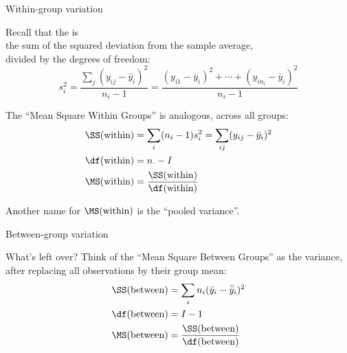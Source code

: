 \begin{frame}{Within-group variation}

  Recall that the  is \\
  the sum of the squared deviation from the sample average,\\
  divided by the degrees of freedom:
  \[
  s_i^2 = \frac{ \sum_j (y_{ij}-\bar y_i)^2 }{ n_i-1 } = \frac{ (y_{i1} - \bar y_i)^2 + \cdots + (y_{in_i} - \bar y_i)^2 }{n_i-1}
  \]

    \vspace{2em}

    The ``\alert{Mean Square Within Groups}'' is analogous, across all groups:
    \begin{align*}
      \SS(\text{within}) &= \sum_{i} (n_i-1) s_i^2 = \sum_{ij} (y_{ij}-\bar y_i)^2 \\
      \df(\text{within}) &= n_\cdot - I \\
      \MS(\text{within}) &= \frac{\SS(\text{within})}{\df(\text{within})}
    \end{align*}

    Another name for $\MS(\text{within})$ is the ``pooled variance''.

\end{frame}

\begin{frame}{Between-group variation}

  What's left over? 
  Think of the ``\alert{Mean Square Between Groups}'' 
  as the variance, after replacing all observations by their group mean:
  \begin{align*}
    \SS(\text{between}) &= \sum_{i} n_i (\bar y_i - \bar{\bar y}_i)^2 \\
      \df(\text{between}) &= I - 1 \\
      \MS(\text{between}) &= \frac{\SS(\text{between})}{\df(\text{between})}
  \end{align*}

\end{frame}

